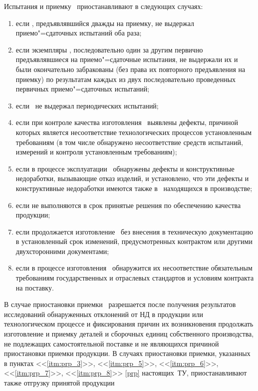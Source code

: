 \point
\label{prp}
Испытания и приемку \dut \ приостанавливают в следующих случаях:
%
\begin{enumerate}
	\item если \dut, предъявлявшийся дважды на приемку, не выдержал приемо"=сдаточных испытаний оба раза;
	\item если экземпляры \dut, последовательно один за другим первично предъявлявшиеся на приемо"=сдаточные испытания, не выдержали их и были окончательно забракованы (без права их повторного предъявления на приемку) по результатам каждых из двух последовательно проведенных первичных приемо"=сдаточных испытаний;
	\item \label{itm:prp_3} если \dut \ не выдержал периодических испытаний;
	\item если при контроле качества изготовления \dut \ выявлены дефекты, причиной которых является несоответствие технологических процессов установленным требованиям (в том числе обнаружено несоответствие средств испытаний, измерений и контроля установленным требованиям);
	\item \label{itm:prp_5} если в процессе эксплуатации \dut \ обнаружены дефекты и конструктивные недоработки, вызывающие отказ изделий, и установлено, что эти дефекты и конструктивные недоработки имеются также в \dut \, находящихся в производстве;
	\item \label{itm:prp_6}если не выполняются в срок принятые решения по обеспечению качества продукции;
	\item \label{itm:prp_7} если продолжается изготовление \dut \ без внесения в техническую документацию в установленный срок изменений, предусмотренных контрактом или другими двухсторонними документами;
	\item \label{itm:prp_8} если в процессе изготовления \dut \ обнаружится их несоответствие обязательным требованиям государственных и отраслевых стандартов и условиям контракта на поставку.
\end{enumerate}

\subpoint
В случае приостановки приемки \dut \ разрешается после получения результатов исследований обнаруженных отклонений от НД в продукции или технологическом процессе и фиксирования причин их возникновения продолжать изготовление и приемку деталей и сборочных единиц собственного производства, не подлежащих самостоятельной поставке и не являющихся причиной приостановки приемки продукции.
\subpoint
В случаях приостановки приемки, указанных в пунктах <<\ref{itm:prp_3}>>, <<\ref{itm:prp_5}>>, <<\ref{itm:prp_6}>>, <<\ref{itm:prp_7}>>, <<\ref{itm:prp_8}>> \ref{prp} настоящих~ТУ, приостанавливают также отгрузку принятой продукции

